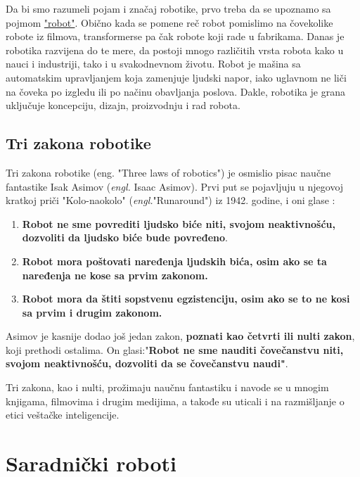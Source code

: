 \documentclass{article}
\begin{document}
	
	
	Da bi smo razumeli pojam i značaj robotike, prvo treba da se upoznamo sa pojmom \href{https://www.sciencefriday.com/segments/the-origin-of-the-word-robot/}{"robot"}.\cite{word robot}
	Obično kada se pomene reč robot pomislimo na čovekolike robote iz filmova, transformerse pa čak robote koji rade u fabrikama. Danas je robotika razvijena do te mere, da postoji mnogo različitih vrsta robota kako u nauci i industriji, tako i u svakodnevnom životu. Robot je mašina sa automatskim upravljanjem koja zamenjuje ljudski napor, iako uglavnom ne liči na čoveka po izgledu ili po načinu obavljanja poslova. Dakle, robotika je grana uključuje koncepciju, dizajn, proizvodnju i rad robota. \cite{robots in nowdays}
	
	\subsection{Tri zakona robotike}
	Tri zakona robotike (eng. "Three laws of robotics") je osmislio pisac naučne fantastike Isak Asimov (\emph{engl.} Isaac Asimov). Prvi put se pojavljuju u njegovoj kratkoj priči "Kolo-naokolo" (\emph{engl.}"Runaround") iz 1942. godine, i oni glase \cite{three laws of robotics}:
	\begin{enumerate}
	\item \textbf{Robot ne sme povrediti ljudsko biće niti, svojom neaktivnošću, dozvoliti da ljudsko biće bude povređeno}.
	
	\item \textbf{Robot mora poštovati naređenja ljudskih bića, osim ako se ta naređenja ne kose sa prvim zakonom.}
	
	\item \textbf{Robot mora da štiti sopstvenu egzistenciju, osim ako se to ne kosi sa prvim i drugim zakonom.}
	\end{enumerate}
	
	Asimov je kasnije dodao još jedan zakon, \textbf{poznati kao četvrti ili nulti zakon}, koji prethodi ostalima. On glasi:"\textbf{Robot ne sme nauditi čovečanstvu niti, svojom neaktivnošću, dozvoliti da se čovečanstvu naudi"}.\par
	Tri zakona, kao i nulti, prožimaju naučnu fantastiku i navode se u mnogim knjigama, filmovima i drugim medijima, a takođe su uticali i na razmišljanje o etici veštačke inteligencije. \cite{three laws of robotics}
	
	
	
	
	\section{Saradnički roboti}
	
\end{document}
